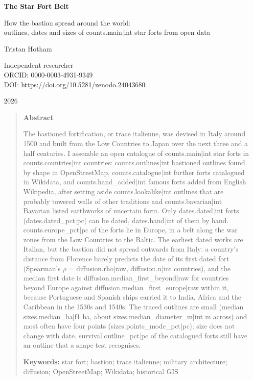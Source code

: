 \documentclass[11pt,a4paper]{article}
\begin{document}
\begin{center}
{\Large\bfseries The Star Fort Belt\par}
\vspace{0.4em}
{\large How the bastion spread around the world:\\outlines, dates and sizes of {{counts.main|int}} star forts from open data\par}
\vspace{1.2em}
{\large Tristan Hotham\par}
\vspace{0.3em}
{\small Independent researcher\\
ORCID: 0000-0003-4931-9349\\
DOI: https://doi.org/10.5281/zenodo.24043680\par}
\vspace{0.8em}
2026
\end{center}

\begin{quote}
\small
\begin{center}\textbf{Abstract}\end{center}
The bastioned fortification, or trace italienne, was devised in Italy around 1500 and built from the Low Countries to Japan over the next three and a half centuries. I assemble an open catalogue of {{counts.main|int}} star forts in {{counts.countries|int}} countries: {{counts.outlines|int}} bastioned outlines found by shape in OpenStreetMap, {{counts.catalogue|int}} further forts catalogued in Wikidata, and {{counts.hand_added|int}} famous forts added from English Wikipedia, after setting aside {{counts.lookalike|int}} outlines that are probably towered walls of other traditions and {{counts.bavarian|int}} Bavarian listed earthworks of uncertain form. Only {{dates.dated|int}} forts ({{dates.dated_pct|pc}}) can be dated, {{dates.hand|int}} of them by hand. {{counts.europe_pct|pc}} of the forts lie in Europe, in a belt along the war zones from the Low Countries to the Baltic. The earliest dated works are Italian, but the bastion did not spread outwards from Italy: a country's distance from Florence barely predicts the date of its first dated fort (Spearman's $\rho$ = {{diffusion.rho|raw}}, {{diffusion.n|int}} countries), and the median first date is {{diffusion.median_first_beyond|raw}} for countries beyond Europe against {{diffusion.median_first_europe|raw}} within it, because Portuguese and Spanish ships carried it to India, Africa and the Caribbean in the 1530s and 1540s. The traced outlines are small (median {{sizes.median_ha|f1}} ha, about {{sizes.median_diameter_m|int}} m across) and most often have four points ({{sizes.points_mode_pct|pc}}); size does not change with date. {{survival.outline_pct|pc}} of the catalogued forts still have an outline that a shape test recognises.

\textbf{Keywords:} star fort; bastion; trace italienne; military architecture; diffusion; OpenStreetMap; Wikidata; historical GIS
\end{quote}
\end{document}
